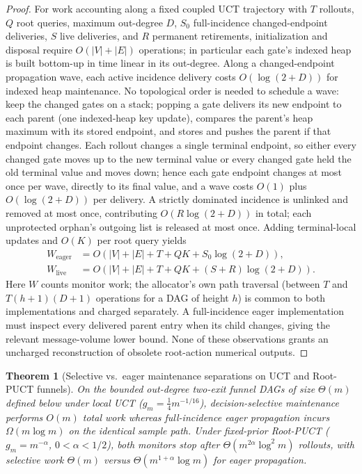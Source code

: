 \documentclass{article}
\theoremstyle{plain}
\newtheorem{theorem}{Theorem}[section]
\theoremstyle{definition}
\begin{document}
\begin{proof}
For work accounting along a fixed coupled UCT trajectory with $T$ rollouts, $Q$ root queries, maximum out-degree $D$, $S_0$ full-incidence changed-endpoint deliveries, $S$ live deliveries, and $R$ permanent retirements, initialization and disposal require $O(|V|+|E|)$ operations; in particular each gate's indexed heap is built bottom-up in time linear in its out-degree. Along a changed-endpoint propagation wave, each active incidence delivery costs $O(\log(2+D))$ for indexed heap maintenance. No topological order is needed to schedule a wave: keep the changed gates on a stack; popping a gate delivers its new endpoint to each parent (one indexed-heap key update), compares the parent's heap maximum with its stored endpoint, and stores and pushes the parent if that endpoint changes. Each rollout changes a single terminal endpoint, so either every changed gate moves up to the new terminal value or every changed gate held the old terminal value and moves down; hence each gate endpoint changes at most once per wave, directly to its final value, and a wave costs $O(1)$ plus $O(\log(2+D))$ per delivery. A strictly dominated incidence is unlinked and removed at most once, contributing $O(R\log(2+D))$ in total; each unprotected orphan's outgoing list is released at most once. Adding terminal-local updates and $O(K)$ per root query yields
\begin{equation}
 \begin{aligned}
  W_{\mathrm{eager}}&=O(|V|+|E|+T+QK+S_0\log(2+D)),\\
  W_{\mathrm{live}}&=O(|V|+|E|+T+QK+(S+R)\log(2+D)).
 \end{aligned}
 \label{eq:ram-work-bounds}
\end{equation}
Here $W$ counts monitor work; the allocator's own path traversal (between $T$ and $T(h+1)(D+1)$ operations for a DAG of height $h$) is common to both implementations and charged separately.
A full-incidence eager implementation must inspect every delivered parent entry when its child changes, giving the relevant message-volume lower bound. None of these observations grants an uncharged reconstruction of obsolete root-action numerical outputs.
\end{proof}


\begin{theorem}[Selective vs.\ eager maintenance separations on UCT and Root-PUCT funnels]
\label{thm:onpolicy-uct}\label{thm:selective-separation}\label{thm:ta-funnel}\label{thm:puct-main}
On the bounded out-degree two-exit funnel DAGs of size $\Theta(m)$ defined below under local UCT ($g_m=\tfrac14 m^{-1/16}$), decision-selective maintenance performs $O(m)$ total work whereas full-incidence eager propagation incurs $\Omega(m\log m)$ on the identical sample path. Under fixed-prior Root-PUCT ($g_m=m^{-\alpha}$, $0<\alpha<1/2$), both monitors stop after $\Theta(m^{2\alpha}\log^2 m)$ rollouts, with selective work $\Theta(m)$ versus $\Theta(m^{1+\alpha}\log m)$ for eager propagation.
\end{theorem}
\end{document}
